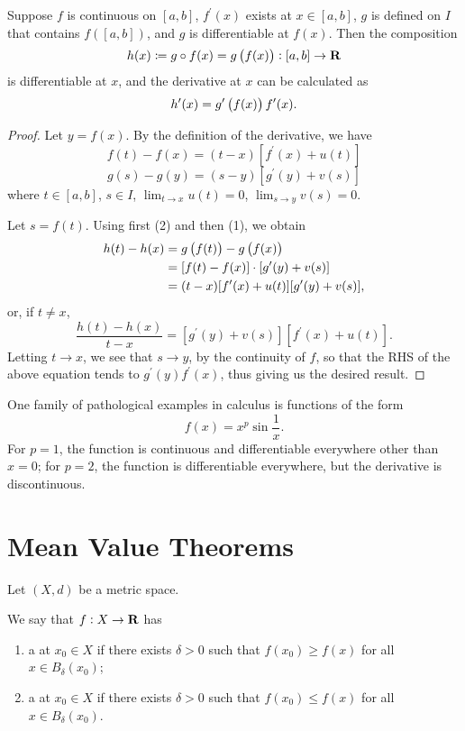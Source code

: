 \begin{theorem}
Suppose $f$ is continuous on $[a,b]$, $f^\prime(x)$ exists at $x\in[a,b]$, $g$ is defined on $I$ that contains $f([a,b])$, and $g$ is differentiable at $f(x)$. Then the composition
\[h(x)\coloneqq g\circ f(x)=g\left(f(x)\right):[a,b]\to\mathbf R\]
is differentiable at $x$, and the derivative at $x$ can be calculated as
\[h^\prime(x)=g^\prime\left(f(x)\right)f^\prime(x).\]
\end{theorem}

\begin{proof}
Let $y=f(x)$. By the definition of the derivative, we have
\begin{equation*}\tag{1}
f(t)-f(x)=(t-x)[f^\prime(x)+u(t)]
\end{equation*}
\begin{equation*}\tag{2}
g(s)-g(y)=(s-y)[g^\prime(y)+v(s)]
\end{equation*}
where $t\in[a,b]$, $s\in I$, $\lim_{t\to x}u(t)=0$, $\lim_{s\to y}v(s)=0$.

Let $s=f(t)$. Using first (2) and then (1), we obtain
\begin{align*}
h(t)-h(x)
&=g\left(f(t)\right)-g\left(f(x)\right)\\
&=[f(t)-f(x)]\cdot[g^\prime(y)+v(s)]\\
&=(t-x)[f^\prime(x)+u(t)][g^\prime(y)+v(s)],
\end{align*}
or, if $t\neq x$,
\[\frac{h(t)-h(x)}{t-x}=[g^\prime(y)+v(s)][f^\prime(x)+u(t)].\]
Letting $t\to x$, we see that $s\to y$, by the continuity of $f$, so that the RHS of the above equation tends to $g^\prime(y)f^\prime(x)$, thus giving us the desired result.
\end{proof}

\begin{example}
One family of pathological examples in calculus is functions of the form
\[f(x)=x^p\sin\frac{1}{x}.\]
For $p=1$, the function is continuous and differentiable everywhere other than $x=0$; for $p=2$, the function is differentiable everywhere, but the derivative is discontinuous.
\end{example}

\section{Mean Value Theorems}
Let $(X,d)$ be a metric space.

\begin{definition}
We say that $f:X\to\mathbf R$ has
\begin{enumerate}[label=(\roman*)]
\item a  at $x_0\in X$ if there exists $\delta>0$ such that $f(x_0)\ge f(x)$ for all $x\in B_\delta(x_0)$;
\item a  at $x_0\in X$ if there exists $\delta>0$ such that $f(x_0)\le f(x)$ for all $x\in B_\delta(x_0)$.
\end{enumerate}
\end{definition}

